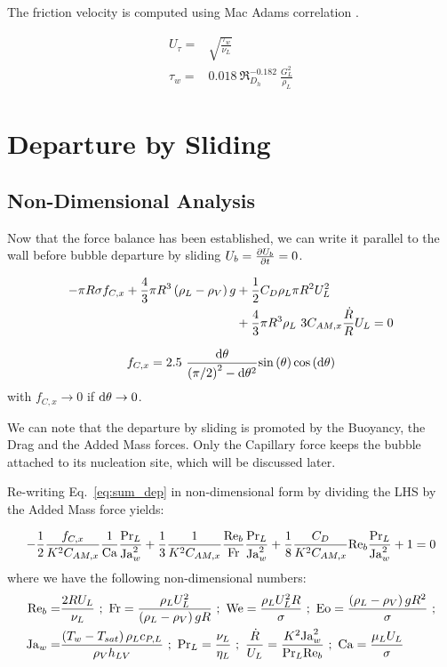 The friction velocity is computed using Mac Adams correlation \cite{mcadams_heat_1954}.

\begin{align}
U_{\tau} =& \sqrt{\frac{\tau_{w}}{\nu_{L}}}\\
\tau_{w} =& 0.018~ \Re_{D_{h}}^{-0.182}~ \frac{G_{L}^{2}}{\rho_{L}}
\end{align}

\section{Departure by Sliding}\label{sec:departure}

\subsection{Non-Dimensional Analysis}\label{subsec:adim_dep}

Now that the force balance has been established, we can write it parallel to the wall before bubble departure by sliding \ie $U_{b}=\frac{\partial{U_{b}}}{\partial t}=0$.

\begin{align}
\label{eq:sum_dep}
\nonumber - \pi R\sigma f_{C,x} + \frac{4}{3}\pi R^{3}\left( \rho_{L}-\rho_{V} \right)g &+ \frac{1}{2}C_{D}\rho_{L}\pi R^{2} U_{L}^{2} \\
& + \frac{4}{3}\pi R^{3}\rho_{L}~3C_{AM,x}\frac{\dot{R}}{R}U_{L} = 0
\end{align}

\begin{equation}
 f_{C,x}=2.5\ \frac{\mathrm{d}\theta}{\left( \pi/2 \right)^{2}-\mathrm{d}\theta^{2}}\mathrm{sin}\left( \theta \right)\mathrm{cos}\left( \mathrm{d}\theta \right)
\end{equation}
with $f_{C,x} \to 0 $ if $\mathrm{d}\theta \to 0$.


We can note that the departure by sliding is promoted by the Buoyancy, the Drag and the Added Mass forces. Only the Capillary force keeps the bubble attached to its nucleation site, which will be discussed later.


\npar
Re-writing Eq.~\ref{eq:sum_dep} in non-dimensional form by dividing the LHS by the Added Mass force yields:

\begin{equation}
\label{eq:adim_dep}
-\frac{1}{2}\frac{f_{C,x}}{K^{2}C_{AM,x}}\frac{1}{\mathrm{Ca}}\frac{\mathrm{Pr}_{L}}{\mathrm{Ja}_{w}^{2}} +  \frac{1}{3}\frac{1}{K^{2}C_{AM,x}}\frac{\mathrm{Re}_{b}}{\mathrm{Fr}}\frac{\mathrm{Pr}_{L}}{\mathrm{Ja}_{w}^{2}} + \frac{1}{8}\frac{C_{D}}{K^{2}C_{AM,x}}\mathrm{Re}_{b}\frac{\mathrm{Pr}_{L}}{\mathrm{Ja}_{w}^{2}} +1 =0
\end{equation}
where we have the following non-dimensional numbers:
\begin{align}
\nonumber \Re_{b} =& \frac{2RU_{L}}{\nu_{L}}\ ;\ \Fr=\frac{\rho_{L}U_{L}^{2}}{\parth{\rho_{L}-\rho_{V}}g R}\ ;\ \We=\frac{\rho_{L}U_{L}^{2}R}{\sigma}\ ; \ \Eo=\frac{\parth{\rho_{L}-\rho_{V}}g R^{2}}{\sigma}\ ;\\
%
\nonumber \Ja_{w}=&\frac{\parth{T_{w}-T_{sat}}\rho_{L} c_{P,L}}{\rho_{V} h_{LV}}\ ;\ \Pr_{L}=\frac{\nu_{L}}{\eta_{L}}\ ;\ \frac{\dot{R}}{U_{L}}=\frac{K^{2}\Ja_{w}^{2}}{\Pr_{L} \Re_{b}}\ ;\ \Ca=\frac{\mu_{L}U_{L}}{\sigma}
\end{align}


